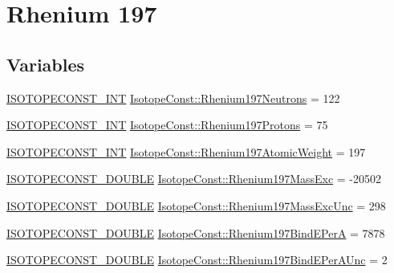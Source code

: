 \hypertarget{group___isotope_const-_rhenium-_re197}{}\section{Rhenium 197}
\label{group___isotope_const-_rhenium-_re197}
\subsection*{Variables}
\begin{DoxyCompactItemize}
\item 
\mbox{\hyperlink{group___isotope_const-_macros_ga5f18360b3e99483a35c32d789e62621c}{I\+S\+O\+T\+O\+P\+E\+C\+O\+N\+S\+T\+\_\+\+I\+NT}} \mbox{\hyperlink{group___isotope_const-_rhenium-_re197_ga77daceff6bf03bcc8db03a9766b8db31}{Isotope\+Const\+::\+Rhenium197\+Neutrons}} = 122
\item 
\mbox{\hyperlink{group___isotope_const-_macros_ga5f18360b3e99483a35c32d789e62621c}{I\+S\+O\+T\+O\+P\+E\+C\+O\+N\+S\+T\+\_\+\+I\+NT}} \mbox{\hyperlink{group___isotope_const-_rhenium-_re197_gacc36880dd60e13301955f898cf1982f2}{Isotope\+Const\+::\+Rhenium197\+Protons}} = 75
\item 
\mbox{\hyperlink{group___isotope_const-_macros_ga5f18360b3e99483a35c32d789e62621c}{I\+S\+O\+T\+O\+P\+E\+C\+O\+N\+S\+T\+\_\+\+I\+NT}} \mbox{\hyperlink{group___isotope_const-_rhenium-_re197_ga598195b08330ed16c3b324b9c0c67c18}{Isotope\+Const\+::\+Rhenium197\+Atomic\+Weight}} = 197
\item 
\mbox{\hyperlink{group___isotope_const-_macros_ga8f45a7272ce02c0b4c65c44636ed719a}{I\+S\+O\+T\+O\+P\+E\+C\+O\+N\+S\+T\+\_\+\+D\+O\+U\+B\+LE}} \mbox{\hyperlink{group___isotope_const-_rhenium-_re197_ga066f49d9f3cb5270896c6a1faae67544}{Isotope\+Const\+::\+Rhenium197\+Mass\+Exc}} = -\/20502
\item 
\mbox{\hyperlink{group___isotope_const-_macros_ga8f45a7272ce02c0b4c65c44636ed719a}{I\+S\+O\+T\+O\+P\+E\+C\+O\+N\+S\+T\+\_\+\+D\+O\+U\+B\+LE}} \mbox{\hyperlink{group___isotope_const-_rhenium-_re197_ga3f74038eaf905632411485aa45b458f8}{Isotope\+Const\+::\+Rhenium197\+Mass\+Exc\+Unc}} = 298
\item 
\mbox{\hyperlink{group___isotope_const-_macros_ga8f45a7272ce02c0b4c65c44636ed719a}{I\+S\+O\+T\+O\+P\+E\+C\+O\+N\+S\+T\+\_\+\+D\+O\+U\+B\+LE}} \mbox{\hyperlink{group___isotope_const-_rhenium-_re197_ga337e77c6e296005f68207e9c4ef2cd4d}{Isotope\+Const\+::\+Rhenium197\+Bind\+E\+PerA}} = 7878
\item 
\mbox{\hyperlink{group___isotope_const-_macros_ga8f45a7272ce02c0b4c65c44636ed719a}{I\+S\+O\+T\+O\+P\+E\+C\+O\+N\+S\+T\+\_\+\+D\+O\+U\+B\+LE}} \mbox{\hyperlink{group___isotope_const-_rhenium-_re197_gab4f36bb4bf0c2a10b34d8a347ddba1e0}{Isotope\+Const\+::\+Rhenium197\+Bind\+E\+Per\+A\+Unc}} = 2

\end{DoxyCompactItemize}
